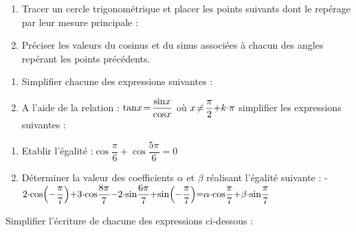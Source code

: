 \documentclass{book}
\begin{document}
\begin{multicols*}{2}
\leavevmode\exercice


\begin{enumerate}
\item Tracer un cercle trigonom\'etrique et placer les points suivants dont le rep\'erage par leur mesure principale :


\item Pr\'eciser les  valeurs du cosinus et du sinus associ\'ees \`a chacun des angles rep\'erant les points pr\'ec\'edents.
\end{enumerate}

\leavevmode\exercice


\begin{enumerate}
\item Simplifier chacune des expressions suivantes :


\item A l'aide de la relation :%
\quad$\Se\tan x=\dfrac{\sin x}{\cos x}$%
\quad o\`u $\Se x\neq\dfrac{\pi}2{+}k{\cdot}\pi$\newline
simplifier les expressions suivantes :

\end{enumerate}

\leavevmode\exercice


\begin{enumerate}
\item Etablir l'\'egalit\'e :\quad$\cos\dfrac{\pi}6+\cos\dfrac{5\pi}6=0$

\item D\'eterminer la valeur des coefficients $\alpha$ et $\beta$ r\'ealisant l'\'egalit\'e suivante :\newline
\hglue-\leftmargini$\sansespace 2{\cdot}\cos\Big({-}\dfrac{\pi}7\Big)+3{\cdot}\cos\dfrac{8\pi}7-2{\cdot}\sin\dfrac{6\pi}7+\sin\Big({-}\dfrac{\pi}7\Big)=\alpha{\cdot}\cos\dfrac{\pi}7+\beta{\cdot}\sin\dfrac{\pi}7$
\end{enumerate}

\leavevmode\exercice[*]


Simplifier l'\'ecriture de chacune des expressions ci-dessous :


\end{multicols*}
\end{document}
